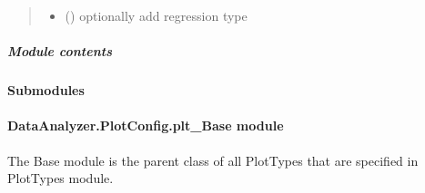 \documentclass[letterpaper,10pt,english]{sphinxmanual}
\begin{document}
\begin{fulllineitems}
\begin{quote}
\begin{description}
\begin{itemize}
\item {} 
 () \textendash{} optionally add regression type

\end{itemize}

\end{description}\end{quote}

\begin{fulllineitems}
\label{\detokenize{DataAnalyzer.PlotConfig.TwoD:DataAnalyzer.PlotConfig.TwoD.plt_TwoD.TwoD.plot}}
\end{fulllineitems}


\end{fulllineitems}



\subparagraph{Module contents}
\label{\detokenize{DataAnalyzer.PlotConfig.TwoD:module-DataAnalyzer.PlotConfig.TwoD}}\label{\detokenize{DataAnalyzer.PlotConfig.TwoD:module-contents}}

\paragraph{Submodules}
\label{\detokenize{DataAnalyzer.PlotConfig:submodules}}

\paragraph{DataAnalyzer.PlotConfig.plt\_Base module}
\label{\detokenize{DataAnalyzer.PlotConfig:module-DataAnalyzer.PlotConfig.plt_Base}}\label{\detokenize{DataAnalyzer.PlotConfig:dataanalyzer-plotconfig-plt-base-module}}
The Base module is the parent class of all PlotTypes that are specified in PlotTypes module.
\end{document}

